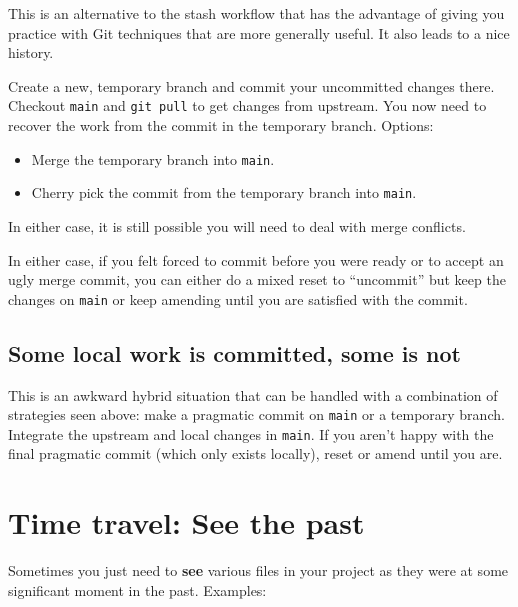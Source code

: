\documentclass[
]{book}
\providecommand{\tightlist}{%
  \setlength{\itemsep}{0pt}\setlength{\parskip}{0pt}}
\begin{document}
This is an alternative to the stash workflow that has the advantage of giving you practice with Git techniques that are more generally useful. It also leads to a nice history.

Create a new, temporary branch and commit your uncommitted changes there. Checkout \texttt{main} and \texttt{git\ pull} to get changes from upstream. You now need to recover the work from the commit in the temporary branch. Options:

\begin{itemize}
\tightlist
\item
  Merge the temporary branch into \texttt{main}.
\item
  Cherry pick the commit from the temporary branch into \texttt{main}.
\end{itemize}

In either case, it is still possible you will need to deal with merge conflicts.

In either case, if you felt forced to commit before you were ready or to accept an ugly merge commit, you can either do a mixed reset to ``uncommit'' but keep the changes on \texttt{main} or keep amending until you are satisfied with the commit.

\section{Some local work is committed, some is not}\label{some-local-work-is-committed-some-is-not}

This is an awkward hybrid situation that can be handled with a combination of strategies seen above: make a pragmatic commit on \texttt{main} or a temporary branch. Integrate the upstream and local changes in \texttt{main}. If you aren't happy with the final pragmatic commit (which only exists locally), reset or amend until you are.

\chapter{Time travel: See the past}\label{time-travel-see-past}

Sometimes you just need to \textbf{see} various files in your project as they were at some significant moment in the past. Examples:
\end{document}
